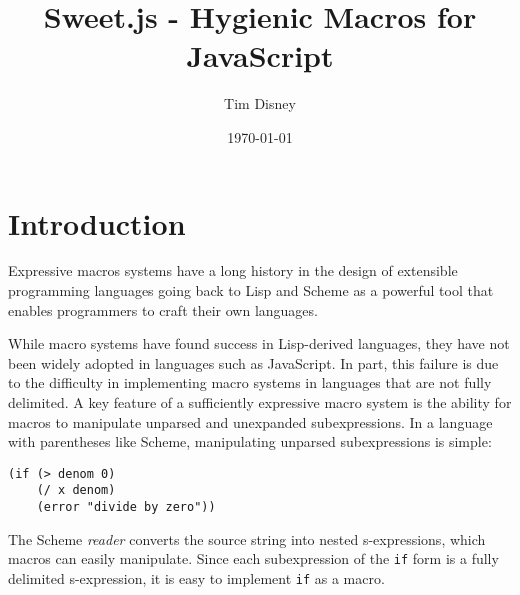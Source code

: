 \documentclass[preprint,10pt]{sigplanconf}
\author{Tim Disney}
\date{\today}
\title{Sweet.js - Hygienic Macros for JavaScript}
\begin{document}

\lstset{
   language=JavaScript,
   extendedchars=true,
   basicstyle=\footnotesize\ttfamily,
   showstringspaces=false,
   showspaces=false,
   numberstyle=\footnotesize,
   numbersep=9pt,
   tabsize=2,
   breaklines=true,
   showtabs=false,
   captionpos=b
}


\maketitle


\section{Introduction}
\label{sec-1}

Expressive macros systems have a long history in the design of
extensible programming languages going back to Lisp and Scheme
\cite{Kohlbecker1987,Foderaro1983} as a powerful tool that enables
programmers to craft their own languages.

While macro systems have found success in Lisp-derived languages,
they have not been widely adopted in languages such as JavaScript. In
part, this failure is due to the difficulty in implementing macro
systems in languages that are not fully delimited. A key feature of a
sufficiently expressive macro system is the ability for macros to
manipulate unparsed and unexpanded subexpressions. In a language with
parentheses like Scheme, manipulating unparsed subexpressions is
simple:
\begin{lstlisting}
(if (> denom 0)
    (/ x denom)
    (error "divide by zero"))
\end{lstlisting}
The Scheme \emph{reader} converts the source string into nested
s-expressions, which macros can easily manipulate. Since each
subexpression of the \verb!if! form is a fully delimited
s-expression, it is easy to implement \verb!if! as a
macro.
\end{document}
